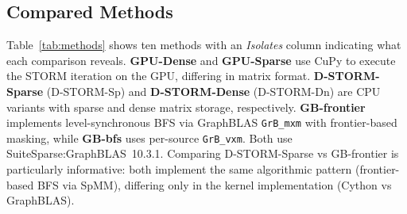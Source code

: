 \documentclass[journal]{IEEEtran}
\begin{document}
\subsection{Compared Methods}

\begin{table}[t]
\centering
\caption{Compared methods and implementation characteristics.}
\label{tab:methods}
\setlength{\tabcolsep}{2pt}
\end{table}

Table~\ref{tab:methods} shows ten methods with an \emph{Isolates} column indicating what each comparison reveals. \textbf{GPU-Dense} and \textbf{GPU-Sparse} use CuPy to execute the STORM iteration on the GPU, differing in matrix format. \textbf{D-STORM-Sparse} (D-STORM-Sp) and \textbf{D-STORM-Dense} (D-STORM-Dn) are CPU variants with sparse and dense matrix storage, respectively. \textbf{GB-frontier} implements level-synchronous BFS via GraphBLAS \texttt{GrB\_mxm} with frontier-based masking, while \textbf{GB-bfs} uses per-source \texttt{GrB\_vxm}. Both use SuiteSparse:GraphBLAS~10.3.1. Comparing D-STORM-Sparse vs GB-frontier is particularly informative: both implement the same algorithmic pattern (frontier-based BFS via SpMM), differing only in the kernel implementation (Cython vs GraphBLAS).
\end{document}

